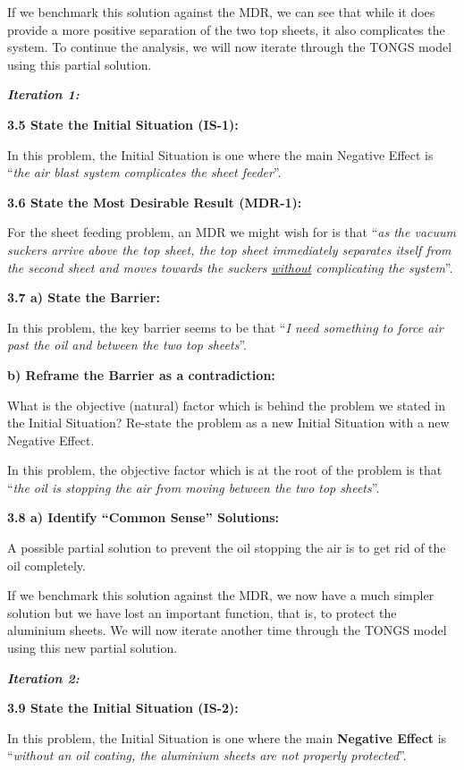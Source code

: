 \documentclass[11pt,a4paper]{article}
\begin{document}
If we benchmark this solution against the MDR, we can see that while it does
provide a more positive separation of the two top sheets, it also complicates
the system.  To continue the analysis, we will now iterate through the TONGS
model using this partial solution.

\textbf{\emph{Iteration 1:}}

\textbf{3.5 State the Initial Situation (IS-1):}

In this problem, the Initial Situation is one where the main Negative Effect
is “\emph{the air blast system complicates the sheet feeder}”.

\textbf{3.6  State the Most Desirable Result (MDR-1):}

For the sheet feeding problem, an MDR we might wish for is that “\emph{as the
  vacuum suckers arrive above the top sheet, the top sheet immediately
  separates itself from the second sheet and moves towards the suckers
  \underline{without} complicating the system}”.

\textbf{3.7 a) State the Barrier:}

In this problem, the key barrier seems to be that “\emph{I need something to
  force air past the oil and between the two top sheets}”.

\textbf{b) Reframe the Barrier as a contradiction:}

What is the objective (natural) factor which is behind the problem we stated
in the Initial Situation?  Re-state the problem as a new Initial Situation
with a new Negative Effect.

In this problem, the objective factor which is at the root of the problem is
that “\emph{the oil is stopping the air from moving between the two top
  sheets}”.

\textbf{3.8 a) Identify “Common Sense” Solutions:}

A possible partial solution to prevent the oil stopping the air is to get rid
of the oil completely.

If we benchmark this solution against the MDR, we now have a much simpler
solution but we have lost an important function, that is, to protect the
aluminium sheets.  We will now iterate another time through the TONGS model
using this new partial solution.

\textbf{\emph{Iteration 2:}}

\textbf{3.9 State the Initial Situation (IS-2):}

In this problem, the Initial Situation is one where the main \textbf{Negative
  Effect} is “\emph{without an oil coating, the aluminium sheets are not
  properly protected}”.
\end{document}

